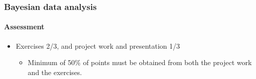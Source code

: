 \documentclass[english]{beamer}
\begin{document}



  


  

  


\begin{frame}
  \frametitle{Bayesian data analysis}  %
  \framesubtitle{Assessment}
  \begin{itemize}
  \item Exercises 2/3, and project work and presentation 1/3
     \begin{itemize}
     \item Minimum of 50\% of points must be obtained from both the project work and the exercises.
     \end{itemize}
  \end{itemize}

\end{frame}
\end{document}
